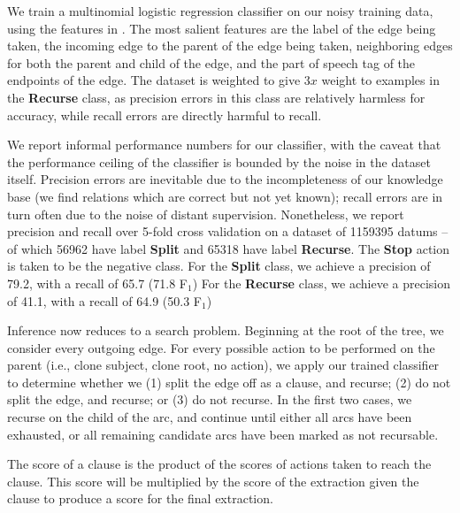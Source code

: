 We train a multinomial logistic regression classifier on our noisy
  training data, using the features in .
The most salient features are the label of the edge being taken, the
  incoming edge to the parent of the edge being taken, neighboring edges
  for both the parent and child of the edge, and the part of speech tag of
  the endpoints of the edge.
The dataset is weighted to give $3x$ weight to examples in the \textbf{Recurse}
  class, as precision errors in this class are relatively harmless for accuracy,
  while recall errors are directly harmful to recall.

We report informal performance numbers for our classifier, with the
  caveat that the performance ceiling of the classifier is bounded by the
  noise in the dataset itself.
Precision errors are inevitable due to the incompleteness of our
  knowledge base (we find relations which are correct but not yet known);
  recall errors are in turn often due to the noise of distant supervision.
Nonetheless, we report precision and recall
  over 5-fold cross validation on a dataset of
  \num{1159395} datums -- of which \num{56962} have label \textbf{Split} and
  \num{65318} have label \textbf{Recurse}.
The \textbf{Stop} action is taken to be the negative class.
For the \textbf{Split} class, we achieve a precision of 79.2, with a recall
  of 65.7 (71.8 F$_1$)
For the \textbf{Recurse} class, we achieve a precision of 41.1, with a recall
  of 64.9 (50.3 F$_1$)

Inference now reduces to a search problem.
Beginning at the root of the tree, we consider every outgoing edge.
  For every possible action to be performed on the parent (i.e., clone subject,
  clone root, no action), we apply our trained classifier to determine
  whether we 
  (1) split the edge off as a clause, and recurse;
  (2) do not split the edge, and recurse; or 
  (3) do not recurse.
In the first two cases, we recurse on the child of the arc, and continue until
  either all arcs have been exhausted, or all remaining candidate arcs
  have been marked as not recursable.

The score of a clause is the product of the scores of actions taken to reach
  the clause.
This score will be multiplied by the score of the extraction given the clause
  to produce a score for the final extraction.
